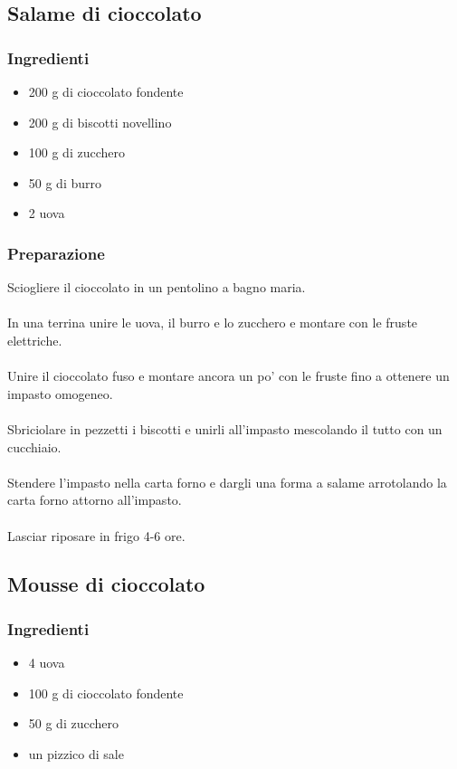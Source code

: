 \documentclass[12pt, a4paper]{article}
\begin{document}
\clearpage

\subsection{Salame di cioccolato}

\subsubsection{Ingredienti}
\begin{itemize}
\item	200 g di cioccolato fondente
\item	200 g di biscotti novellino
\item	100 g di zucchero
\item	50 g di burro
\item   2 uova
\end{itemize}

\subsubsection{Preparazione}
	Sciogliere il cioccolato in un pentolino a bagno maria.\\\\
	In una terrina unire le uova, il burro e lo zucchero e montare con le
	fruste elettriche.\\\\
	Unire il cioccolato fuso e montare ancora un po' con le fruste fino
	a ottenere un impasto omogeneo.\\\\
	Sbriciolare in pezzetti i biscotti e unirli all'impasto mescolando
	il tutto con un cucchiaio.\\\\
	Stendere l'impasto nella carta forno e dargli una forma a salame arrotolando
	la carta forno attorno all'impasto.\\\\
	Lasciar riposare in frigo 4-6 ore.
\clearpage

\subsection{Mousse di cioccolato}

\subsubsection{Ingredienti}
\begin{itemize}
\item   4 uova
\item	100 g di cioccolato fondente
\item	50 g di zucchero
\item	un pizzico di sale
\end{itemize}
\end{document}
